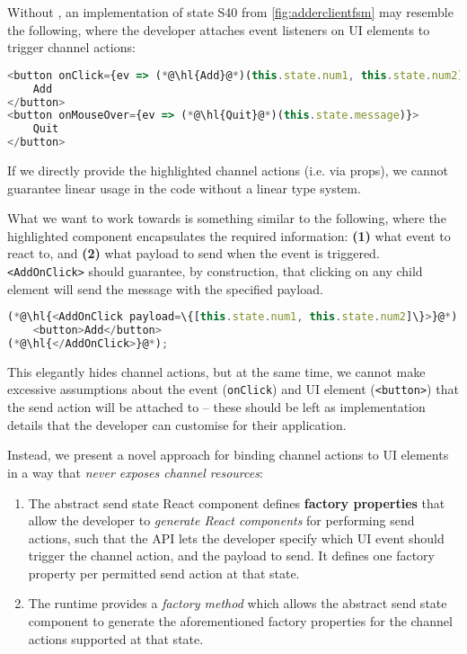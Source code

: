 Without \reactcodegen,
an implementation of state S40 from \cref{fig:adderclientfsm}
may resemble the following, where the developer attaches
event listeners on UI elements to trigger channel actions:

\begin{lstlisting}[language=javascript,numbers=none]
<button onClick={ev => (*@\hl{Add}@*)(this.state.num1, this.state.num2)}>
	Add
</button>
<button onMouseOver={ev => (*@\hl{Quit}@*)(this.state.message)}>
	Quit
</button>
\end{lstlisting}

If we directly provide the highlighted channel actions 
(i.e. via props), we cannot guarantee linear usage in the code 
without a linear type system.

What we want to work towards is something similar to the following,
where the highlighted component encapsulates the required information: 
\textbf{(1)} what event to react to, 
and \textbf{(2)} what payload to send when the event is triggered.
\texttt{<AddOnClick>} should guarantee, by construction,
that clicking on any child element will send the 
message with the specified payload.

\begin{lstlisting}[language=javascript,numbers=none]
(*@\hl{<AddOnClick payload=\{[this.state.num1, this.state.num2]\}>}@*)
	<button>Add</button>
(*@\hl{</AddOnClick>}@*);
\end{lstlisting}

This elegantly hides channel actions, but at the same time,
we cannot make excessive assumptions about the 
event (\texttt{onClick}) and UI element (\texttt{<button>})
that the send action will be attached to --
these should be left as implementation details that 
the developer can customise for their application.

Instead, we present a novel approach for binding
channel actions to UI elements in a way that \textit{never
exposes channel resources}:

\begin{enumerate}
\item
The abstract send state React component defines
\textbf{factory properties}
that allow the developer to \textit{generate React components}
for performing send actions, such that the API lets the developer
specify which UI event should trigger the channel action,
and the payload to send. It defines one factory property per
permitted send action at that state.

\item
The runtime provides a \textit{factory method}
which allows the abstract send state component to
generate the aforementioned factory properties
for the channel actions supported at that state.
\end{enumerate}

